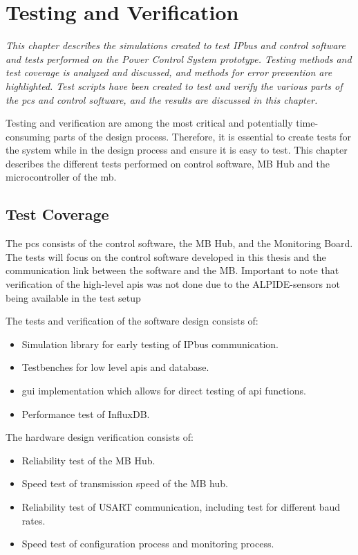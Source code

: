 \documentclass[main.tex]{subfiles}
\begin{document}
\section{Testing and Verification}
\label{section:testV}
\textit{This chapter describes the simulations created to test IPbus and control software and tests performed on the Power Control System prototype. Testing methods and test coverage is analyzed and discussed, and methods for error prevention are highlighted. Test scripts have been created to test and verify the various parts of the \gls{pcs} and control software, and the results are discussed in this chapter.}

Testing and verification are among the most critical and potentially time-consuming parts of the design process. Therefore, it is essential to create tests for the system while in the design process and ensure it is easy to test. This chapter describes the different tests performed on control software, MB Hub and the microcontroller of the \gls{mb}.

\subsection{Test Coverage}

The \gls{pcs} consists of the control software, the MB Hub, and the Monitoring Board. The tests will focus on the control software developed in this thesis and the communication link between the software and the MB. Important to note that verification of the high-level \gls{api}s was not done due to the ALPIDE-sensors not being available in the test setup

The tests and verification of the software design consists of:

\begin{itemize}
    \item Simulation library for early testing of IPbus communication.
    \item Testbenches for low level \gls{api}s and database.
    \item \gls{gui} implementation which allows for direct testing of \gls{api} functions.
    \item Performance test of InfluxDB.
\end{itemize}

The hardware design verification consists of:

\begin{itemize}
    \item Reliability test of the MB Hub.
    \item Speed test of transmission speed of the MB hub.
    \item Reliability test of USART communication, including test for different baud rates.
    \item Speed test of configuration process and monitoring process.
\end{itemize}
\end{document}
